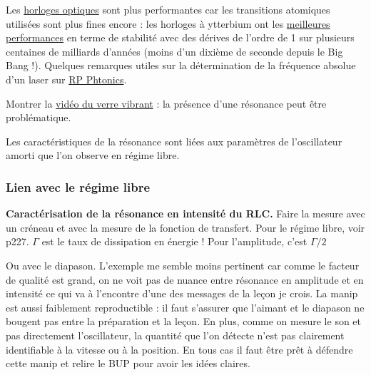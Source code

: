 \begin{remarque}
Les \href{https://www.rp-photonics.com/optical_clockworks.html}{horloges optiques} sont plus performantes car les transitions atomiques utilisées sont plus fines encore : les horloges à ytterbium ont les \href{https://www.nature.com/articles/s41586-018-0738-2.epdf?sharing_token=FIAZjmJMqixyHlimG5lZR9RgN0jAjWel9jnR3ZoTv0NOfvtdRGwNwsijc3L-wdrRb6DF0vb25L6JDgze8-Ez9_P7gtDhvd6Ohf2fGgppvCB0X-kg27ArE1M-_123JKobog97pnYcj6HXzgnQR8rvnEnh2szZWcsjs3iTQoltrq902DQaUqdwu-tfeoFpO2IP38lBfqV_hdqg28l1ptt7M-PeiTD59RRAR6YB4NH8cdhllMt46BYK03GkjoGNMHdUg-jFHfsZFxk8V2FOARslaavGtlPodYzx2Knkijyvf6sgup8zUfeTjvHaoHNKaM6y&tracking_referrer=ici.radio-canada.ca}{meilleures performances} en terme de stabilité avec des dérives de l'ordre de \unit{1}{\second} sur plusieurs centaines de milliards d'années (moins d'un dixième de seconde depuis le Big Bang !).
Quelques remarques utiles sur la détermination de la fréquence absolue d'un laser sur \href{https://www.rp-photonics.com/frequency_metrology.html}{RP Phtonics}.
\end{remarque}

\begin{slide}
Montrer la \href{https://www.youtube.com/watch?v=7cgZcbHmxm4}{vidéo du verre vibrant} : la présence d'une résonance peut être problématique.
\end{slide}

\begin{transition}
Les caractéristiques de la résonance sont liées aux paramètres de l'oscillateur amorti que l'on observe en régime libre.
\end{transition}

\subsubsection{Lien avec le régime libre}

\begin{experience}
\textbf{Caractérisation de la résonance en intensité du RLC.}
Faire la mesure avec un créneau et avec la mesure de la fonction de transfert.
Pour le régime libre, voir \cite{Michel2017} p227.
$\Gamma$ est le taux de dissipation en énergie !
Pour l'amplitude, c'est $\Gamma/2$

\noindent
Ou avec le diapason.
L'exemple me semble moins pertinent car comme le facteur de qualité est grand, on ne voit pas de nuance entre résonance en amplitude et en intensité ce qui va à l'encontre d'une des messages de la leçon je crois.
La manip est aussi faiblement reproductible : il faut s'assurer que l'aimant et le diapason ne bougent pas entre la préparation et la leçon.
En plus, comme on mesure le son et pas directement l'oscillateur, la quantité que l'on détecte n'est pas clairement identifiable à la vitesse ou à la position.
En tous cas il faut être prêt à défendre cette manip et relire le BUP pour avoir les idées claires.
\end{experience}

